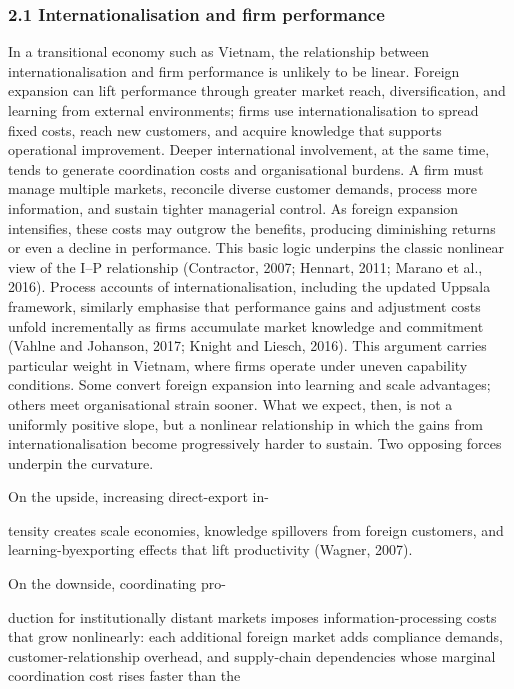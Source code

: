\documentclass[12pt,a4paper]{article}
\begin{document}
\hypertarget{21-internationalisation-and-firm-performance}{%
\subsubsection{2.1 Internationalisation and firm
performance}\label{21-internationalisation-and-firm-performance}}

In a transitional economy such as Vietnam, the relationship between
internationalisation and firm performance is unlikely to be linear.
Foreign expansion can lift performance through greater market reach,
diversification, and learning from external environments; firms use
internationalisation to spread fixed costs, reach new customers, and
acquire knowledge that supports operational improvement. Deeper
international involvement, at the same time, tends to generate
coordination costs and organisational burdens. A firm must manage
multiple markets, reconcile diverse customer demands, process more
information, and sustain tighter managerial control. As foreign
expansion intensifies, these costs may outgrow the benefits, producing
diminishing returns or even a decline in performance. This basic logic
underpins the classic nonlinear view of the I--P relationship
(Contractor, 2007; Hennart, 2011; Marano et al., 2016). Process accounts
of internationalisation, including the updated Uppsala framework,
similarly emphasise that performance gains and adjustment costs unfold
incrementally as firms accumulate market knowledge and commitment
(Vahlne and Johanson, 2017; Knight and Liesch, 2016). This argument
carries particular weight in Vietnam, where firms operate under uneven
capability conditions. Some convert foreign expansion into learning and
scale advantages; others meet organisational strain sooner. What we
expect, then, is not a uniformly positive slope, but a nonlinear
relationship in which the gains from internationalisation become
progressively harder to sustain. Two opposing forces underpin the
curvature.

On the upside, increasing direct-export in-

tensity creates scale economies, knowledge spillovers from foreign
customers, and learning-byexporting effects that lift productivity
(Wagner, 2007).

On the downside, coordinating pro-

duction for institutionally distant markets imposes
information-processing costs that grow nonlinearly: each additional
foreign market adds compliance demands, customer-relationship overhead,
and supply-chain dependencies whose marginal coordination cost rises
faster than the
\end{document}
